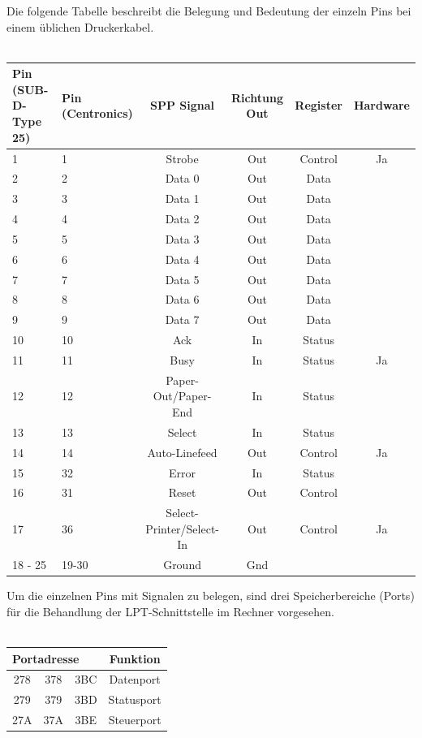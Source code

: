 \documentclass[a4paper,11pt]{article}
\begin{document}
 
 Die folgende Tabelle beschreibt die  Belegung und Bedeutung der einzeln Pins bei einem üblichen Druckerkabel. 
 \\ \\
 \begin{tabular}{|p{20mm}|p{20mm}|c|c|c|c|}
  \hline
	Pin (SUB-D-Type 25) & Pin (Centronics) & SPP Signal & Richtung Out & Register & Hardware\\ \hline
	1 & 1	& 	Strobe					& 	Out		&	Control	&	Ja	\\ \hline
	2 & 2	&	Data 0					&	Out		& 	Data		&     \\ \hline
	3 &	3	&	Data 1				&	Out		&	Data		&     \\ \hline
	4 &	4	&	Data 2				&	Out		&	Data		&     \\ \hline
	5 &	5	&	Data 3				&	Out		&	Data		&     \\ \hline
	6 &	6	&	Data 4				&	Out		&	Data		&     \\ \hline
	7 &	7	&	Data 5				&	Out		&	Data		&     \\ \hline
	8 &	8	&	Data 6				&	Out		&	Data		&     \\ \hline
	9 &	9	&	Data 7				&	Out		&	Data		&     \\ \hline
	10 & 10	&	Ack					&	In		&	Status	&	    \\ \hline
	11 & 11	&	Busy					&	In		&	Status	&	Ja  \\ \hline
	12 & 12	&	Paper-Out/Paper-End	&	In		&	Status	&	    \\ \hline
	13 & 13	&	Select				&	In		&	Status	&	    \\ \hline
	14 & 14	&	Auto-Linefeed			&	Out		&	Control	&	Ja  \\ \hline
	15 & 32	&	Error					&	In		&	Status	&	    \\ \hline
	16 & 31	&	Reset				&	Out		&	Control	&	    \\ \hline
	17 & 36	&	Select-Printer/Select-In	&	Out		&	Control	&	Ja  \\ \hline
	18 - 25	&	19-30				&	Ground	&	Gnd	&	&             \\ \hline
 \end{tabular}


Um die einzelnen Pins mit Signalen zu belegen, sind drei Speicherbereiche (Ports) für die Behandlung der LPT-Schnittstelle im Rechner vorgesehen.  \\\\
 \begin{tabular}{|c|c|c|c|}
 \hline
\multicolumn{3}{|l|}{Portadresse}	&	Funktion\\  \hline 
278	&	378	&	3BC	&	Datenport \\  \hline 
279	&	379	&	3BD	&	Statusport \\  \hline 
27A	&	37A	&	3BE	&	Steuerport \\  \hline 
 \end{tabular} 
 
\end{document}
